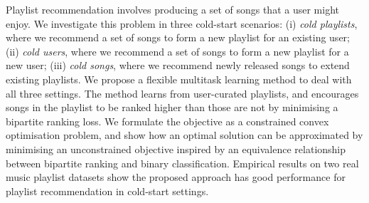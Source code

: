 
Playlist recommendation involves producing a set of songs that a user might enjoy.
We investigate this problem in three %
cold-start scenarios:
(i) \emph{cold playlists}, where we recommend a set of songs to form a new playlist for an existing user; %
(ii) \emph{cold users}, where we recommend a set of songs to form a new playlist for a new user; %
(iii) \emph{cold songs}, where we recommend newly released songs to extend existing playlists.
%
We propose a flexible multitask learning method to deal with all three settings.
The method learns from user-curated playlists,
and encourages songs in the playlist 
to be ranked higher than those are not
by minimising a %
bipartite ranking loss.
We formulate the objective as a constrained convex optimisation problem,
and show how an optimal solution can be approximated by minimising an unconstrained objective
inspired by an equivalence relationship between bipartite ranking and binary classification.
Empirical results on two real music playlist datasets show the proposed approach has good performance for playlist recommendation
in cold-start settings.
